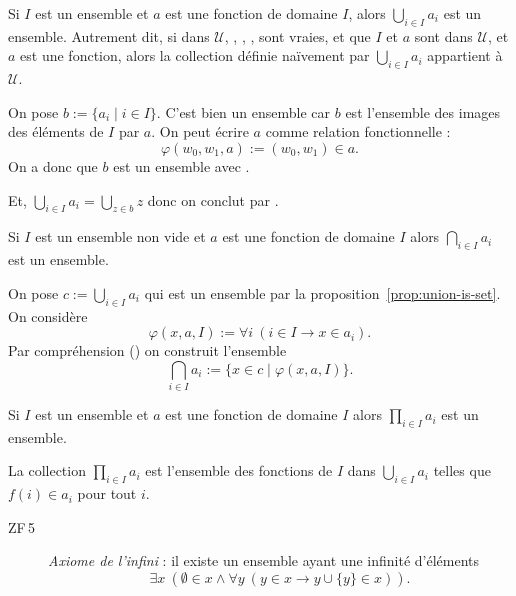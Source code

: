 \documentclass[./main]{subfiles}
\begin{document}
  \begin{prop}
    Si $I$ est un ensemble et $a$ est une fonction de domaine $I$, alors $\bigcup_{i \in  I} a_i$ est un ensemble.
    Autrement dit, si dans $\mathcal{U}$, , , ,  sont vraies, et que $I$ et $a$ sont dans $\mathcal{U}$, et $a$ est une fonction, alors la collection définie naïvement par $\bigcup_{i \in  I} a_i$ appartient à $\mathcal{U}$.
    \label{prop:union-is-set}
  \end{prop}
  \begin{prv}
    On pose $b := \{a_i  \mid i \in I\}$. C'est bien un ensemble car $b$ est l'ensemble des images des éléments de $I$ par $a$. On peut écrire $a$ comme relation fonctionnelle :
    \[
    \varphi(w_0, w_1, a) := (w_0, w_1) \in a
    .\]
    On a donc que $b$ est un ensemble avec .

    Et, $\bigcup_{i \in  I} a_i = \bigcup_{z \in b} z$ donc on conclut par .
  \end{prv}

  \begin{prop}
    Si $I$ est un ensemble non vide et $a$ est une fonction de domaine $I$ alors $\bigcap_{i \in  I} a_i$ est un ensemble.
  \end{prop}
  \begin{prv}
    On pose $c := \bigcup_{i \in  I} a_i$ qui est un ensemble par la proposition~\ref{prop:union-is-set}.
    On considère \[
    \varphi(x, a, I) := \forall i \: (i \in I \to x \in a_i)
    .\]
    Par compréhension () on construit l'ensemble \[
    \bigcap_{i \in  I} a_i := \{x \in c  \mid \varphi(x, a, I)\} 
    .\]
  \end{prv}

  \begin{prop}
    Si $I$ est un ensemble et $a$ est une fonction de domaine $I$ alors $\prod_{i \in I} a_i $ est un ensemble.
  \end{prop}
  \begin{prv}
    La collection $\prod_{i \in I} a_i$ est l'ensemble des fonctions de $I$ dans $\bigcup_{i \in  I} a_i$ telles que $f(i) \in a_i$ pour tout $i$.
  \end{prv}

  \begin{description}
    \item[ZF\,5\label{ZF5}] \textit{Axiome de l'infini} : il existe un ensemble ayant une infinité d'éléments
      \[
      \exists x \: (\emptyset \in x \land \forall y \: (y \in x \to y \cup \{y\} \in x ))
      .\]
  \end{description}
\end{document}
